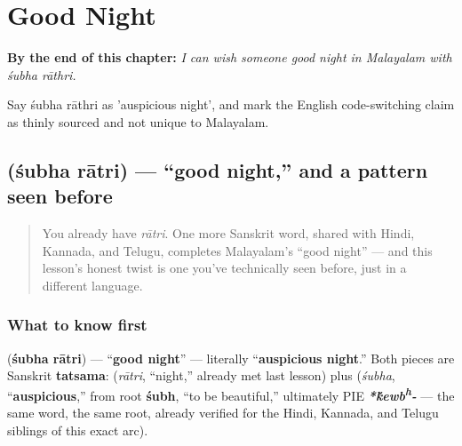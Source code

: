 
\chapter{Good Night}
\label{ch:ml-good-night}

\begin{chapteropening}
\textbf{By the end of this chapter:} \emph{I can wish someone good night in Malayalam with śubha rāthri.}

Say śubha rāthri as 'auspicious night', and mark the English code-switching claim as thinly sourced and not unique to Malayalam.
\end{chapteropening}

\section[\texorpdfstring{\ml{ശുഭ} \ml{രാത്രി} (śubha rātri)}{ശുഭ രാത്രി (śubha rātri)}]{  (śubha rātri) — \textquotedblleft{}good night,\textquotedblright{} and a pattern seen before}

\label{lesson:ML-C25-shubha-rathri}



\begin{quote}
You already have \emph{rātri}. One more Sanskrit word, shared with Hindi, Kannada, and Telugu, completes Malayalam's \textquotedblleft{}good night\textquotedblright{} — and this lesson's honest twist is one you've technically seen before, just in a different language.
\end{quote}

\subsection*{What to know first}
\textbf{ } (\textbf{śubha rātri}) — \textquotedblleft{}\textbf{good night}\textquotedblright{} — literally \textquotedblleft{}\textbf{auspicious night}.\textquotedblright{} Both pieces are Sanskrit \textbf{tatsama}: \textbf{} (\emph{rātri}, \textquotedblleft{}night,\textquotedblright{} already met last lesson) plus \textbf{} (\emph{śubha}, \textquotedblleft{}\textbf{auspicious},\textquotedblright{} from root \textbf{śubh}, \textquotedblleft{}to be beautiful,\textquotedblright{} ultimately PIE \emph{\textbf{*\'{k}ewb\textsuperscript{h}-}} — the same word, the same root, already verified for the Hindi, Kannada, and Telugu siblings of this exact arc).

